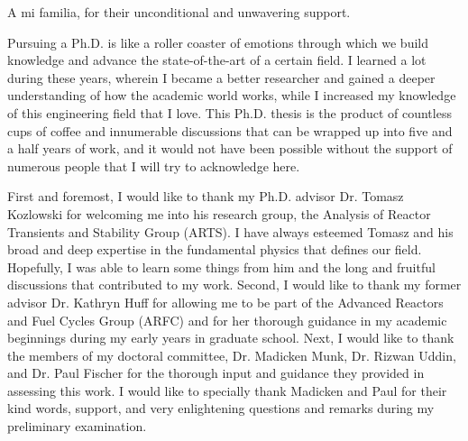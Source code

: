 \documentclass{uiucthesis2021}
\begin{document}
\begin{dedication}
A mi familia, for their unconditional and unwavering support.
\end{dedication}

\begin{acknowledgments}

Pursuing a Ph.D. is like a roller coaster of emotions through which we build knowledge and advance the state-of-the-art of a certain field.
I learned a lot during these years, wherein I became a better researcher and gained a deeper understanding of how the academic world works, while I increased my knowledge of this engineering field that I love.
This Ph.D. thesis is the product of countless cups of coffee and innumerable discussions that can be wrapped up into five and a half years of work, and it would not have been possible without the support of numerous people that I will try to acknowledge here.

First and foremost, I would like to thank my Ph.D. advisor Dr. Tomasz Kozlowski for welcoming me into his research group, the Analysis of Reactor Transients and Stability Group (ARTS).
I have always esteemed Tomasz and his broad and deep expertise in the fundamental physics that defines our field.
Hopefully, I was able to learn some things from him and the long and fruitful discussions that contributed to my work.
Second, I would like to thank my former advisor Dr. Kathryn Huff for allowing me to be part of the Advanced Reactors and Fuel Cycles Group (ARFC) and for her thorough guidance in my academic beginnings during my early years in graduate school.
Next, I would like to thank the members of my doctoral committee, Dr. Madicken Munk, Dr. Rizwan Uddin, and Dr. Paul Fischer for the thorough input and guidance they provided in assessing this work.
I would like to specially thank Madicken and Paul for their kind words, support, and very enlightening questions and remarks during my preliminary examination.


\end{acknowledgments}
\end{document}
